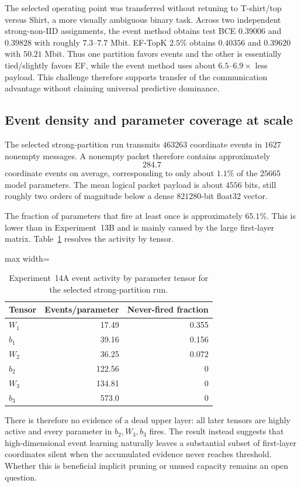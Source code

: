 The selected operating point was transferred without retuning to T-shirt/top versus Shirt, a more visually ambiguous binary task. Across two independent strong-non-IID assignments, the event method obtains test BCE $0.39006$ and $0.39828$ with roughly $7.3$--$7.7$ Mbit. EF-TopK $2.5\%$ obtains $0.40356$ and $0.39620$ with $50.21$ Mbit. Thus one partition favors events and the other is essentially tied/slightly favors EF, while the event method uses about $6.5$--$6.9\times$ less payload. This challenge therefore supports transfer of the communication advantage without claiming universal predictive dominance.

\subsection{Event density and parameter coverage at scale}

The selected strong-partition run transmits $463263$ coordinate events in $1627$ nonempty messages. A nonempty packet therefore contains approximately
\begin{equation}
284.7
\end{equation}
coordinate events on average, corresponding to only about $1.1\%$ of the $25665$ model parameters. The mean logical packet payload is about $4556$ bits, still roughly two orders of magnitude below a dense $821280$-bit float32 vector.

The fraction of parameters that fire at least once is approximately $65.1\%$. This is lower than in Experiment~13B and is mainly caused by the large first-layer matrix. Table~\ref{tab:exp14a-tensor-activity} resolves the activity by tensor.
\begin{table}[ht]
\centering
\small
\caption{Experiment~14A event activity by parameter tensor for the selected strong-partition run.}
\label{tab:exp14a-tensor-activity}
\begin{adjustbox}{max width=\textwidth}
\begin{tabular}{lrr}
\toprule
Tensor & Events/parameter & Never-fired fraction\\
\midrule
$W_1$ & 17.49 & 0.355\\
$b_1$ & 39.16 & 0.156\\
$W_2$ & 36.25 & 0.072\\
$b_2$ & 122.56 & 0\\
$W_3$ & 134.81 & 0\\
$b_3$ & 573.0 & 0\\
\bottomrule
\end{tabular}
\end{adjustbox}
\end{table}
There is therefore no evidence of a dead upper layer: all later tensors are highly active and every parameter in $b_2,W_3,b_3$ fires. The result instead suggests that high-dimensional event learning naturally leaves a substantial subset of first-layer coordinates silent when the accumulated evidence never reaches threshold. Whether this is beneficial implicit pruning or unused capacity remains an open question.

